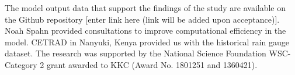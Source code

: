 \documentclass[draft]{agujournal2019}
\begin{document}
%




%
%
%
%
%
%
%
%


\acknowledgments
The model output data that support the findings of the study are available on the Github repository [enter link here (link will be added upon acceptance)]. Noah Spahn provided consultations to improve computational efficiency in the model. %
CETRAD in Nanyuki, Kenya provided us with the historical rain gauge dataset.   
The research was supported by the National Science Foundation WSC-Category 2  grant awarded to KKC (Award No. 1801251 and 1360421). 


%
%





%
%
%
%
%
\end{document}
